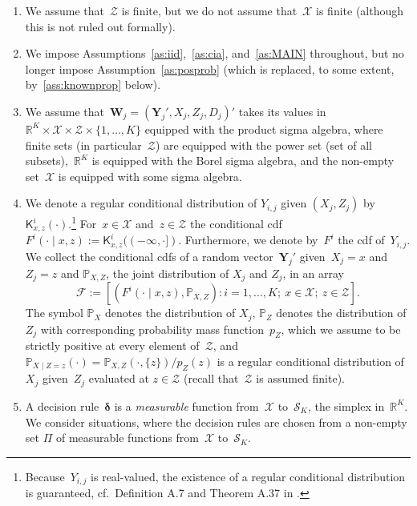 \documentclass[11pt, a4paper]{article}
\newcommand{\R}{\mathbb{R}}
\theoremstyle{definition}
\begin{document}
\begin{enumerate}
\item We assume that~$\mathcal{Z}$ is finite, but we do not assume that~$\mathcal{X}$ is finite (although this is not ruled out formally).
\item We impose Assumptions~\ref{as:iid},~\ref{as:cia}, and~\ref{as:MAIN} throughout, but no longer impose Assumption~\ref{as:posprob} (which is replaced, to some extent, by~\ref{ass:knownprop} below).
\item We assume that~$\bm{W}_j = (\bm{Y}_j', X_j, Z_j, D_j)'$ takes its values in~$\R^{K} \times  \mathcal{X} \times \mathcal{Z} \times \{1, \hdots, K\}$ equipped with the product sigma algebra, where finite sets (in particular~$\mathcal{Z}$) are equipped with the power set (set of all subsets),~$\R^K$ is equipped with the Borel sigma algebra, and the non-empty set~$\mathcal{X}$ is equipped with some sigma algebra. 
\item We denote a regular conditional distribution of $Y_{i,j}$ given $(X_j, Z_j)$ by~$\mathsf{K}^i_{x, z}(\cdot)$.\footnote{Because~$Y_{i,j}$ is real-valued, the existence of a regular conditional distribution is guaranteed, cf.~Definition A.7 and Theorem A.37 in \cite{liese}.} For~$x \in \mathcal{X}$ and~$z \in \mathcal{Z}$ the conditional cdf~$F^{i}(\cdot \mid x, z) := \mathsf{K}^i_{x, z}((-\infty, \cdot])$. Furthermore, we denote by~$F^i$ the cdf of~$Y_{i, j}$. We collect the conditional cdfs of a random vector~$\bm{Y}_j'$ given~$X_j = x$ and~$Z_j = z$ and $\mathbb{P}_{X, Z}$, the joint distribution of $X_j$ and $Z_j$, in an array
\begin{equation}\label{eqn:array2}
\mathcal{F} := \left[(F^i(\cdot\mid x, z), \mathbb{P}_{X, Z}): i = 1, \hdots, K;~x \in \mathcal{X};~z \in \mathcal{Z}\right].
\end{equation}
The symbol $\mathbb{P}_X$ denotes the distribution of $X_j$, $\mathbb{P}_Z$ denotes the distribution of $Z_j$ with corresponding probability mass function~$p_Z$, which we assume to be strictly positive at every element of~$\mathcal{Z}$, and $\mathbb{P}_{X \mid Z = z}(\cdot) = \mathbb{P}_{X, Z}( \cdot, \{z\})/p_Z(z)$ is a regular conditional distribution of $X_j$ given~$Z_j$ evaluated at $z \in \mathcal{Z}$ (recall that~$\mathcal{Z}$ is assumed finite).
\item A decision rule~$\bm{\delta}$ is a \emph{measurable} function from~$\mathcal{X}$ to~$\mathscr{S}_K$, the simplex in~$\R^K$. We consider situations, where the decision rules are chosen from a non-empty set $\Pi$ of measurable functions from~$\mathcal{X}$ to~$\mathscr{S}_K$.

\end{enumerate}
\end{document}
